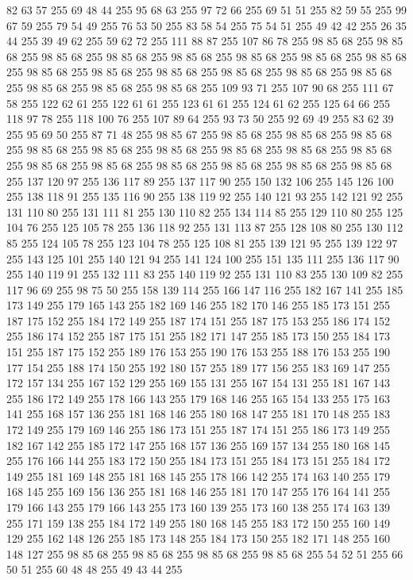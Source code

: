 82 63 57 255 69 48 44 255 95 68 63 255 97 72 66 255 69 51 51 255 82 59 55 255 99 67 59 255 79 54 49 255 76 53 50 255 83 58 54 255 75 54 51 255 49 42 42 255 26 35 44 255 39 49 62 255 59 62 72 255 111 88 87 255 107 86 78 255 98 85 68 255 98 85 68 255 98 85 68 255 98 85 68 255 98 85 68 255 98 85 68 255 98 85 68 255 98 85 68 255 98 85 68 255 98 85 68 255 98 85 68 255 98 85 68 255 98 85 68 255 98 85 68 255 98 85 68 255 98 85 68 255 98 85 68 255 109 93 71 255 107 90 68 255 111 67 58 255 122 62 61 255 122 61 61 255 123 61 61 255 124 61 62 255 125 64 66 255 118 97 78 255 118 100 76 255 107 89 64 255 93 73 50 255 92 69 49 255 83 62 39 255 95 69 50 255 87 71 48 255 98 85 67 255 98 85 68 255 98 85 68 255 98 85 68 255 98 85 68 255 98 85 68 255 98 85 68 255 98 85 68 255 98 85 68 255 98 85 68 255 98 85 68 255 98 85 68 255 98 85 68 255 98 85 68 255
98 85 68 255 98 85 68 255 137 120 97 255 136 117 89 255 137 117 90 255 150 132 106 255 145 126 100 255 138 118 91 255 135 116 90 255 138 119 92 255 140 121 93 255 142 121 92 255 131 110 80 255 131 111 81 255 130 110 82 255 134 114 85 255 129 110 80 255 125 104 76 255 125 105 78 255 136 118 92 255 131 113 87 255 128 108 80 255 130 112 85 255 124 105 78 255 123 104 78 255 125 108 81 255 139 121 95 255 139 122 97 255 143 125 101 255 140 121 94 255 141 124 100 255 151 135 111 255 136 117 90 255 140 119 91 255 132 111 83 255 140 119 92 255 131 110 83 255 130 109 82 255 117 96 69 255 98 75 50 255 158 139 114 255 166 147 116 255 182 167 141 255 185 173 149 255 179 165 143 255 182 169 146 255 182 170 146 255 185 173 151 255 187 175 152 255 184 172 149 255 187 174 151 255 187 175 153 255 186 174 152 255 186 174 152 255 187 175 151 255 182 171 147 255 185 173 150 255 184 173 151 255 187 175 152 255 189 176 153 255 190 176 153 255 188 176 153 255 190 177 154 255 188 174 150 255
192 180 157 255 189 177 156 255 183 169 147 255 172 157 134 255 167 152 129 255 169 155 131 255 167 154 131 255 181 167 143 255 186 172 149 255 178 166 143 255 179 168 146 255 165 154 133 255 175 163 141 255 168 157 136 255 181 168 146 255 180 168 147 255 181 170 148 255 183 172 149 255 179 169 146 255 186 173 151 255 187 174 151 255 186 173 149 255 182 167 142 255 185 172 147 255 168 157 136 255 169 157 134 255 180 168 145 255 176 166 144 255 183 172 150 255 184 173 151 255 184 173 151 255 184 172 149 255 181 169 148 255 181 168 145 255 178 166 142 255 174 163 140 255 179 168 145 255 169 156 136 255 181 168 146 255 181 170 147 255 176 164 141 255 179 166 143 255 179 166 143 255 173 160 139 255 173 160 138 255 174 163 139 255 171 159 138 255 184 172 149 255 180 168 145 255 183 172 150 255 160 149 129 255 162 148 126 255 185 173 148 255 184 173 150 255 182 171 148 255 160 148 127 255 98 85 68 255 98 85 68 255 98 85 68 255 98 85 68 255 54 52 51 255 66 50 51 255 60 48 48 255 49 43 44 255
